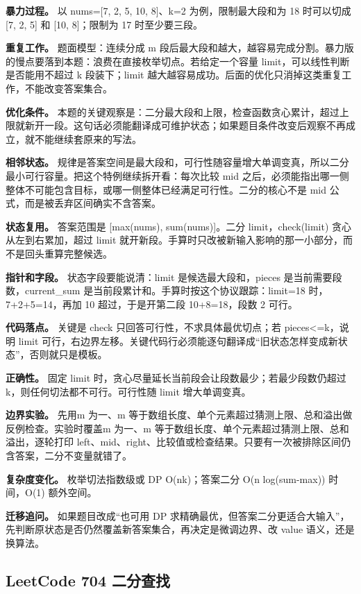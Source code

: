 \textbf{暴力过程。} 以 nums=[7, 2, 5, 10, 8]、k=2 为例，限制最大段和为 18 时可以切成 [7, 2, 5] 和 [10, 8]；限制为 17 时至少要三段。

\textbf{重复工作。} 题面模型：连续分成 m 段后最大段和越大，越容易完成分割。暴力版的慢点要落到本题：浪费在直接枚举切点。若给定一个容量 limit，可以线性判断是否能用不超过 k 段装下；limit 越大越容易成功。后面的优化只消掉这类重复工作，不能改变答案集合。

\textbf{优化条件。} 本题的关键观察是：二分最大段和上限，检查函数贪心累计，超过上限就新开一段。这句话必须能翻译成可维护状态；如果题目条件改变后观察不再成立，就不能继续套原来的写法。

\textbf{相邻状态。} 规律是答案空间是最大段和，可行性随容量增大单调变真，所以二分最小可行容量。把这个特例继续拆开看：每次比较 mid 之后，必须能指出哪一侧整体不可能包含目标，或哪一侧整体已经满足可行性。二分的核心不是 mid 公式，而是被丢弃区间确实不含答案。

\textbf{状态复用。} 答案范围是 [max(nums), sum(nums)]。二分 limit，check(limit) 贪心从左到右累加，超过 limit 就开新段。手算时只改被新输入影响的那一小部分，而不是回头重算完整候选。

\textbf{指针和字段。} 状态字段要能说清：limit 是候选最大段和，pieces 是当前需要段数，current\_sum 是当前段累计和。手算时按这个协议跟踪：limit=18 时，7+2+5=14，再加 10 超过，于是开第二段 10+8=18，段数 2 可行。

\textbf{代码落点。} 关键是 check 只回答可行性，不求具体最优切点；若 pieces<=k，说明 limit 可行，右边界左移。关键代码行必须能逐句翻译成“旧状态怎样变成新状态”，否则就只是模板。

\textbf{正确性。} 固定 limit 时，贪心尽量延长当前段会让段数最少；若最少段数仍超过 k，则任何切法都不可行。可行性随 limit 增大单调变真。

\textbf{边界实验。} 先用m 为一、m 等于数组长度、单个元素超过猜测上限、总和溢出做反例检查。实验时覆盖m 为一、m 等于数组长度、单个元素超过猜测上限、总和溢出，逐轮打印 left、mid、right、比较值或检查结果。只要有一次被排除区间仍含答案，二分不变量就错了。

\textbf{复杂度变化。} 枚举切法指数级或 DP O(nk)；答案二分 O(n log(sum-max)) 时间，O(1) 额外空间。

\textbf{迁移追问。} 如果题目改成“也可用 DP 求精确最优，但答案二分更适合大输入”，先判断原状态是否仍然覆盖新答案集合，再决定是微调边界、改 value 语义，还是换算法。

\subsection{LeetCode 704 二分查找}

